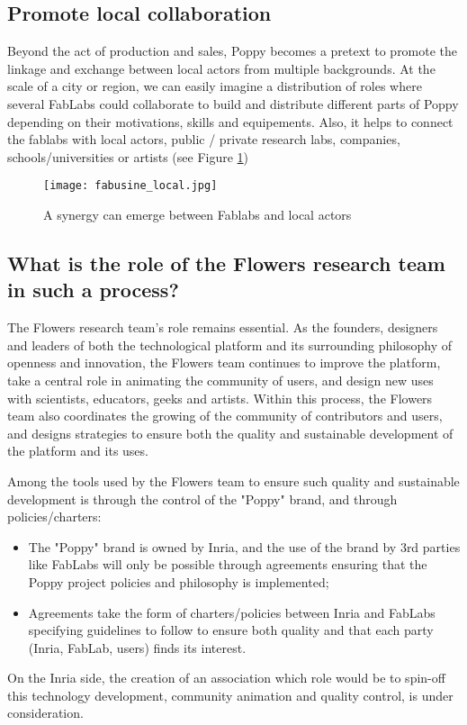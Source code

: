 \subsection{Promote local collaboration } %

Beyond the act of production and sales, Poppy becomes a pretext to promote the linkage and exchange between local actors from multiple backgrounds. At the scale of a city or region, we can easily imagine a distribution of roles where several FabLabs could collaborate to build and distribute different parts of Poppy depending on their motivations, skills and equipements.
Also, it helps to connect the fablabs with local actors, public / private research labs, companies, schools/universities or artists (see Figure \ref{fig:local_synergy})

\begin{figure}[tb]
    \begin{center}
        \texttt{[image: fabusine\_local.jpg]}
    \end{center}
    \caption{A synergy can emerge between Fablabs and local actors}
    \label{fig:local_synergy}
\end{figure}

\subsection{What is the role of the Flowers research team in such a process? } %

The Flowers research team's role remains essential. As the founders, designers and leaders of both the technological platform and its surrounding philosophy of openness and innovation, the Flowers team continues to improve the platform, take a central role in animating the community of users, and design new uses with scientists, educators, geeks and artists. Within this process, the Flowers team also coordinates the growing of the community of contributors and users, and designs strategies to ensure both the quality and sustainable development of the platform and its uses.

Among the tools used by the Flowers team to ensure such quality and sustainable development is through the control of the "Poppy" brand, and through policies/charters:

\begin{itemize}
\item The "Poppy" brand is owned by Inria, and the use of the brand by 3rd parties like FabLabs will only be possible through agreements ensuring that the Poppy project policies and philosophy is implemented;
\item Agreements take the form of charters/policies between Inria and FabLabs specifying guidelines to follow to ensure both quality and that each party (Inria, FabLab, users) finds its interest.
\end{itemize}

On the Inria side, the creation of an association which role would be to spin-off this technology development, community animation and quality control, is under consideration.






